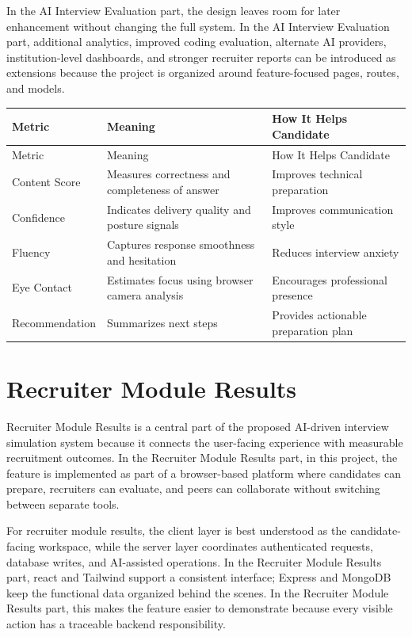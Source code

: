 \documentclass[12pt,a4paper]{report}
\begin{document}
In the AI Interview Evaluation part, the design leaves room for later enhancement without changing the full system. In the AI Interview Evaluation part, additional analytics, improved coding evaluation, alternate AI providers, institution-level dashboards, and stronger recruiter reports can be introduced as extensions because the project is organized around feature-focused pages, routes, and models.


\begin{longtable}{|>{\raggedright\arraybackslash}p{}|>{\raggedright\arraybackslash}p{}|>{\raggedright\arraybackslash}p{}|}
\hline
Metric & Meaning & How It Helps Candidate \\
\hline
\endfirsthead
\hline
Metric & Meaning & How It Helps Candidate \\
\hline
\endhead
Content Score & Measures correctness and completeness of answer & Improves technical preparation \\
\hline
Confidence & Indicates delivery quality and posture signals & Improves communication style \\
\hline
Fluency & Captures response smoothness and hesitation & Reduces interview anxiety \\
\hline
Eye Contact & Estimates focus using browser camera analysis & Encourages professional presence \\
\hline
Recommendation & Summarizes next steps & Provides actionable preparation plan \\
\hline
\end{longtable}

\section{Recruiter Module Results}

Recruiter Module Results is a central part of the proposed AI-driven interview simulation system because it connects the user-facing experience with measurable recruitment outcomes. In the Recruiter Module Results part, in this project, the feature is implemented as part of a browser-based platform where candidates can prepare, recruiters can evaluate, and peers can collaborate without switching between separate tools.


For recruiter module results, the client layer is best understood as the candidate-facing workspace, while the server layer coordinates authenticated requests, database writes, and AI-assisted operations. In the Recruiter Module Results part, react and Tailwind support a consistent interface; Express and MongoDB keep the functional data organized behind the scenes. In the Recruiter Module Results part, this makes the feature easier to demonstrate because every visible action has a traceable backend responsibility.
\end{document}
